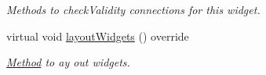\begin{Indent}
\begin{DoxyCompactItemize}
\begin{DoxyCompactList}\small\item\em Methods to check\+Validity connections for this widget. \end{DoxyCompactList}\item 
\mbox{\label{classrev_1_1_view_1_1_sprite_sheet_widget_a5b895d774885d3d8646d0fa7c4719655}} 
virtual void \mbox{\hyperlink{classrev_1_1_view_1_1_sprite_sheet_widget_a5b895d774885d3d8646d0fa7c4719655}{layout\+Widgets}} () override
\begin{DoxyCompactList}\small\item\em \mbox{\hyperlink{struct_method}{Method}} to ay out widgets. \end{DoxyCompactList}\end{DoxyCompactItemize}
\end{Indent}
